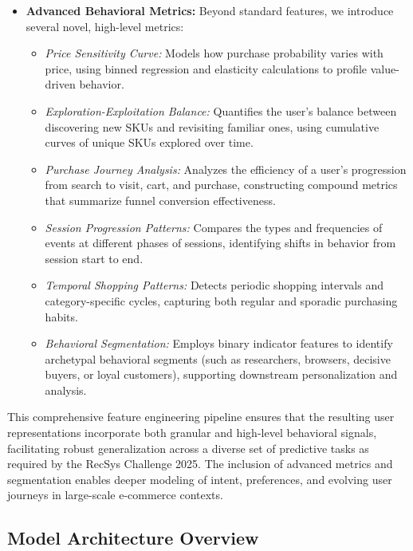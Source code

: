 \documentclass[sigconf]{acmart}
\begin{document}
\begin{itemize}
  \item \textbf{Advanced Behavioral Metrics:}
  Beyond standard features, we introduce several novel, high-level metrics:
    \begin{itemize}
      \item \textit{Price Sensitivity Curve:} Models how purchase probability varies with price, using binned regression and elasticity calculations to profile value-driven behavior.
      \item \textit{Exploration-Exploitation Balance:} Quantifies the user's balance between discovering new SKUs and revisiting familiar ones, using cumulative curves of unique SKUs explored over time.
      \item \textit{Purchase Journey Analysis:} Analyzes the efficiency of a user’s progression from search to visit, cart, and purchase, constructing compound metrics that summarize funnel conversion effectiveness.
      \item \textit{Session Progression Patterns:} Compares the types and frequencies of events at different phases of sessions, identifying shifts in behavior from session start to end.
      \item \textit{Temporal Shopping Patterns:} Detects periodic shopping intervals and category-specific cycles, capturing both regular and sporadic purchasing habits.
      \item \textit{Behavioral Segmentation:} Employs binary indicator features to identify archetypal behavioral segments (such as researchers, browsers, decisive buyers, or loyal customers), supporting downstream personalization and analysis.
    \end{itemize}
\end{itemize}\vspace{-1em}
This comprehensive feature engineering pipeline ensures that the resulting user representations incorporate both granular and high-level behavioral signals, facilitating robust generalization across a diverse set of predictive tasks as required by the RecSys Challenge 2025. The inclusion of advanced metrics and segmentation enables deeper modeling of intent, preferences, and evolving user journeys in large-scale e-commerce contexts.
\subsection{Model Architecture Overview}
\end{document}
